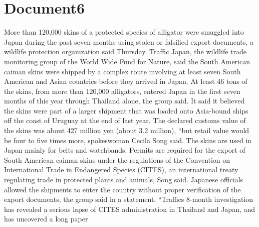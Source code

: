 \documentclass{article}
\begin{document}
\color[rgb]{0,0,0}\section{Document6}
\color[rgb]{0.5529411764705883,0.9490196078431372,0.9137254901960784}More than 120,000 skins of a protected species of alligator were smuggled into Japan during the past seven months \color[rgb]{0.9137254901960784,0.34509803921568627,0.1568627450980392}using stolen or falsified export documents, a \color[rgb]{0.5529411764705883,0.9490196078431372,0.9137254901960784}wildlife protection organization said Thursday. Traffic Japan, the wildlife trade monitoring group of the World Wide Fund for Nature, said the South American caiman skins were \color[rgb]{0.7333333333333333,0.09803921568627451,0.40784313725490196}shipped by a complex route involving at least seven South American and Asian \color[rgb]{0.8666666666666667,0.11372549019607843,0.5411764705882353}countries \color[rgb]{0.7333333333333333,0.09803921568627451,0.40784313725490196}before they arrived in Japan. At least 46 tons of the \color[rgb]{0.5529411764705883,0.9490196078431372,0.9137254901960784}skins, from more than 120,000 alligators, entered Japan in the first seven months of this year through Thailand alone, the group said. It said it believed the skins were part of a larger \color[rgb]{0.7333333333333333,0.09803921568627451,0.40784313725490196}shipment that was loaded onto Asia-bound ships off the coast of \color[rgb]{0.9647058823529412,0.1568627450980392,0.9411764705882353}Uruguay at the \color[rgb]{0.5529411764705883,0.9490196078431372,0.9137254901960784}end of last year. The declared customs value of the skins was about 427 \color[rgb]{0.9647058823529412,0.1568627450980392,0.9411764705882353}million yen (about 3.2 million), ``but retail value would be \color[rgb]{0.5529411764705883,0.9490196078431372,0.9137254901960784}four to five times more, spokeswoman Cecila Song said. The skins are used in \color[rgb]{0.7333333333333333,0.09803921568627451,0.40784313725490196}Japan mainly for belts and watchbands. \color[rgb]{0.5529411764705883,0.9490196078431372,0.9137254901960784}Permits are required for the \color[rgb]{0.9647058823529412,0.1568627450980392,0.9411764705882353}export of South \color[rgb]{0.5529411764705883,0.9490196078431372,0.9137254901960784}American caiman skins under the regulations of the Convention on International Trade in Endangered Species (CITES), an \color[rgb]{0.8666666666666667,0.11372549019607843,0.5411764705882353}international treaty regulating \color[rgb]{0.5529411764705883,0.9490196078431372,0.9137254901960784}trade in protected plants and animals, Song said. \color[rgb]{0.7333333333333333,0.09803921568627451,0.40784313725490196}Japanese officials \color[rgb]{0.9137254901960784,0.34509803921568627,0.1568627450980392}allowed the shipments to enter the country without proper verification of the export documents, the \color[rgb]{0.5529411764705883,0.9490196078431372,0.9137254901960784}group said in a statement. ``Traffics 8-month investigation has revealed a serious lapse of CITES administration in Thailand and Japan, and has \color[rgb]{0.9137254901960784,0.34509803921568627,0.1568627450980392}uncovered a long paper 
\end{document}

